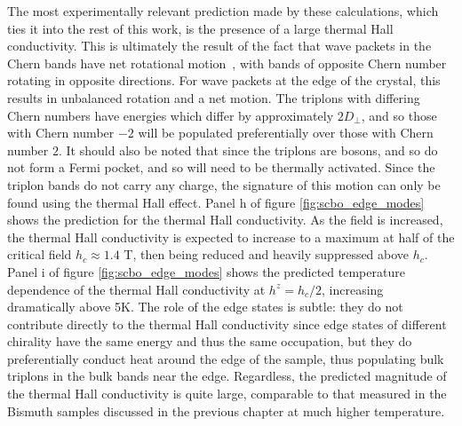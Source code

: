 \documentclass{thesis-umich}
\begin{document}
The most experimentally relevant prediction made by these calculations, which ties it into the rest of this work, is the presence of a large thermal Hall conductivity. This is ultimately the result of the fact that wave packets in the Chern bands have net rotational motion~\cite{Xiao2010}, with bands of opposite Chern number rotating in opposite directions. For wave packets at the edge of the crystal, this results in unbalanced rotation and a net motion. The triplons with differing Chern numbers have energies which differ by approximately $2D_\perp$, and so those with Chern number $-2$ will be populated preferentially over those with Chern number $2$. It should also be noted that since the triplons are bosons, and so do not form a Fermi pocket, and so will need to be thermally activated. Since the triplon bands do not carry any charge, the signature of this motion can only be found using the thermal Hall effect. Panel h of figure \ref{fig:scbo_edge_modes} shows the prediction for the thermal Hall conductivity. As the field is increased, the thermal Hall conductivity is expected to increase to a maximum at half of the critical field $h_c \approx 1.4$ T, then being reduced and heavily suppressed above $h_c$. Panel i of figure \ref{fig:scbo_edge_modes} shows the predicted temperature dependence of the thermal Hall conductivity at $h^z = h_c/2$, increasing dramatically above 5K. The role of the edge states is subtle: they do not contribute directly to the thermal Hall conductivity since edge states of different chirality have the same energy and thus the same occupation, but they do preferentially conduct heat around the edge of the sample, thus populating bulk triplons in the bulk bands near the edge. Regardless, the predicted magnitude of the thermal Hall conductivity is quite large, comparable to that measured in the Bismuth samples discussed in the previous chapter at much higher temperature.
\end{document}
